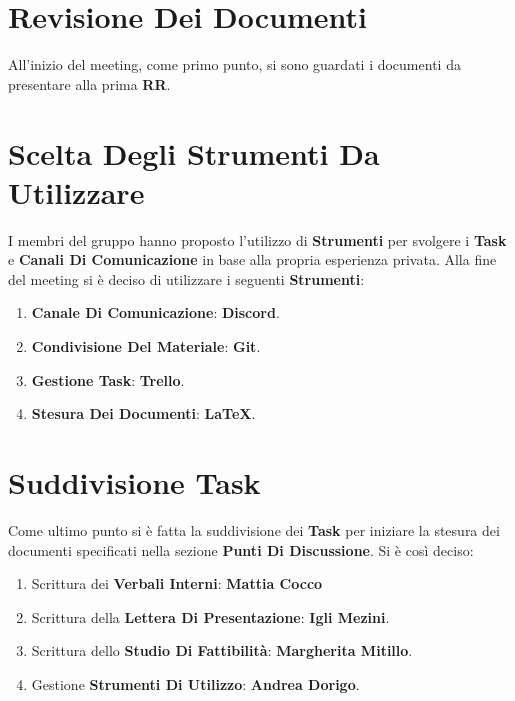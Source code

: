 	\chapter{Revisione Dei Documenti}
	All'inizio del meeting, come primo punto, si sono guardati i documenti da presentare alla prima \textbf{RR}.
	
	\chapter{Scelta Degli Strumenti Da Utilizzare}
	I membri del gruppo hanno proposto l'utilizzo di \textbf{Strumenti} per svolgere i \textbf{Task} e \textbf{Canali Di Comunicazione} in base alla propria esperienza privata.
	Alla fine del meeting si è deciso di utilizzare i seguenti \textbf{Strumenti}:
	\begin{enumerate}
		\item \textbf{Canale Di Comunicazione}: \textbf{Discord}.
		\item \textbf{Condivisione Del Materiale}: \textbf{Git}.
		\item \textbf{Gestione Task}: \textbf{Trello}.
		\item \textbf{Stesura Dei Documenti}: \textbf{LaTeX}.
	\end{enumerate}
	 
	\chapter{Suddivisione Task}
	Come ultimo punto si è fatta la suddivisione dei \textbf{Task} per iniziare la stesura dei documenti specificati nella sezione \textbf{Punti Di Discussione}.
	Si è così deciso:
	\begin{enumerate}
		\item Scrittura dei \textbf{Verbali Interni}: \textbf{Mattia Cocco}
		\item Scrittura della \textbf{Lettera Di Presentazione}: \textbf{Igli Mezini}.
		\item Scrittura dello \textbf{Studio Di Fattibilità}: \textbf{Margherita Mitillo}.
		\item Gestione \textbf{Strumenti Di Utilizzo}: \textbf{Andrea Dorigo}.
	\end{enumerate}